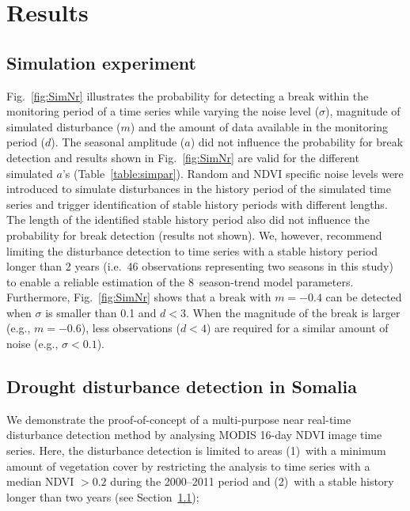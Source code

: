 \documentclass[authoryear,preprint,review,10pt]{elsarticle}
\begin{document}
\section{Results}

\subsection{Simulation experiment} \label{sec:DiscSim}

Fig.~\ref{fig:SimNr} illustrates the probability for detecting a break within the monitoring period of a time series while varying the noise level ($\sigma$), magnitude of simulated disturbance ($m$) and the amount of data available in the monitoring period ($d$). The seasonal amplitude ($a$) did not influence the probability for break detection and results shown in Fig.~\ref{fig:SimNr}  are valid for the different simulated $a$'s (Table~\ref{table:simpar}). 
Random and NDVI specific noise levels were introduced to simulate disturbances in the history period of the simulated time series and trigger identification of stable history periods with different lengths. The length of the identified stable history period also did not influence the probability for break detection (results not shown). We, however, recommend limiting the disturbance detection to time series with a stable history period longer than 2 years (i.e.\ 46 observations representing two seasons in this study) to enable a reliable estimation of the 8~season-trend model parameters. Furthermore, Fig.~\ref{fig:SimNr} shows that a break with $m = -0.4$ can be detected when $\sigma$ is smaller than 0.1 and $d < 3$.  When the magnitude of
the break is larger (e.g., $m = -0.6$), less observations ($d<4$) are required for a similar amount of noise (e.g., $\sigma < 0.1$). 

\subsection{Drought disturbance detection in Somalia} \label{sec:DiscReal}

We demonstrate the proof-of-concept of a multi-purpose near real-time disturbance detection method by analysing MODIS 16-day NDVI image time series. Here, the disturbance detection is limited to areas (1)~with a minimum amount of vegetation cover by restricting the analysis to time series with a median NDVI $>0.2$ during the 2000--2011 period \citep{Vrieling:2011da} and (2)~with a stable history longer than two years (see Section~\ref{sec:DiscSim});
\end{document}
